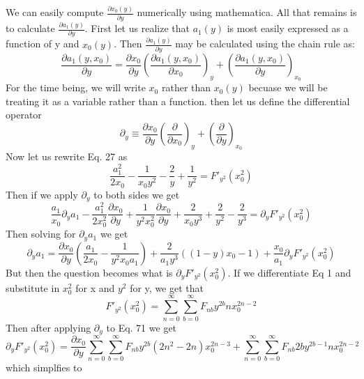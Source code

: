 \documentclass{article}
\begin{document}
We can easily compute \(\frac{\partial x_0(y)}{\partial y}\) numerically using mathematica. All that remains is to calculate \(\frac{\partial a_1(y)}{\partial y}\). First let us realize that \(a_1(y)\) is most easily expressed as a function of y and \(x_0(y)\). Then \(\frac{\partial a_1(y)}{\partial y}\) may be calculated using the chain rule as:
\[\frac{\partial a_1(y,x_0)}{\partial y}=\frac{\partial x_0}{\partial y}\left(\frac{\partial a_1(y,x_0)}{\partial x_0}\right)_y+\left(\frac{\partial a_1(y,x_0)}{\partial y}\right)_{x_0}\]
For the time being, we will write \(x_0\) rather than \(x_0(y)\) becuase we will be treating it as a variable rather than a function.
then let us define the differential operator 
\begin{equation}
\partial_y \equiv \frac{\partial x_0}{\partial y}\left(\frac{\partial }{\partial x_0}\right)_y+\left(\frac{\partial}{\partial y}\right)_{x_0}
\end{equation}
Now let us rewrite Eq. 27 as 
\begin{equation}
\frac{a_1^2}{2x_0}-\frac{1}{x_0y^2}-\frac{2}{y}+\frac{1}{y^2}=F'_{y^2}(x_0^2)
\end{equation}
Then if we apply \(\partial_y\) to both sides we get
\begin{equation}
\frac{a_1}{x_0}\partial_y a_1-\frac{a_1^2}{2x_0^2}\frac{\partial x_0}{\partial y}+\frac{1}{y^2x_0^2}\frac{\partial x_0}{\partial y}+\frac{2}{x_0y^3}+\frac{2}{y^2}-\frac{2}{y^3}=\partial_yF'_{y^2}(x_0^2)
\end{equation}
Then solving for \(\partial_y a_1\) we get
\begin{equation}
\partial_y a_1=\frac{\partial x_0}{\partial y}\left(\frac{a_1}{2x_0}-\frac{1}{y^2x_0a_1}\right) +\frac{2}{a_1y^3}((1-y)x_0-1)+\frac{x_0}{a_1}\partial_y F'_{y^2}(x_0^2)
\end{equation}
But then the question becomes what is \(\partial_y F'_{y^2}(x_0^2)\). If we differentiate Eq 1 and substitute in \(x_0^2\) for x and \(y^2\) for y, we get that 
\begin{equation}
F'_{y^2}(x_0^2)=\sum_{n=0}^\infty\sum_{b=0}^\infty F_{nb}y^{2b}nx_0^{2n-2}
\end{equation}
Then after applying \(\partial_y\) to Eq. 71 we get
\begin{equation}
\partial_yF'_{y^2}(x_0^2)=\frac{\partial x_0}{\partial y}\sum_{n=0}^\infty\sum_{b=0}^\infty F_{nb}y^{2b}(2n^2-2n)x_0^{2n-3}+\sum_{n=0}^\infty\sum_{b=0}^\infty F_{nb}2by^{2b-1}nx_0^{2n-2}
\end{equation}
which simplfies to 
\end{document}
